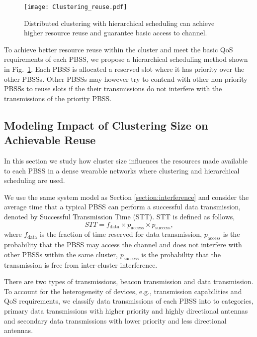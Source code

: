 \documentclass[10pt, conference, letterpaper]{IEEEtran}
\begin{document}
\begin{figure}
	\centering
	\texttt{[image: Clustering\_reuse.pdf]}
	\caption{Distributed clustering  with hierarchical scheduling can achieve higher resource reuse and guarantee basic access to channel.}
	\label{fig:clustering:reuse}
\end{figure}


To achieve better resource reuse within the cluster and meet the basic QoS requirements of each PBSS, we propose a hierarchical scheduling method shown in Fig.~\ref{fig:clustering:reuse}. 
Each PBSS is allocated a reserved slot where it has priority over the other PBSSs. 
Other PBSSs may however try to contend with other non-priority PBSSs to reuse slots if the their transmissions do not interfere with the transmissions of the priority PBSS.

\subsection{Modeling Impact of Clustering Size on Achievable Reuse}
In this section we study how cluster size influences the resources made available to each PBSS in a dense wearable networks where clustering and hierarchical scheduling are used. 

We use the same system model as Section \ref{section:interference} and consider the average time that a typical PBSS can perform a successful data transmission, denoted by Successful Transmission Time (STT).
STT is defined as follows, 
\begin{equation*}
STT = f_{\mathrm{data}}\times p_{\mathrm{access}} \times p_{\mathrm{success}},
\end{equation*}
where $f_{\mathrm{data}}$ is the fraction of time reserved for data transmission, $p_{\mathrm{access}}$ is the probability that the PBSS may access the channel and does not interfere with other PBSSs within the same cluster,
$p_{\mathrm{success}}$ is the probability that the transmission is free from inter-cluster interference.


There are two types of transmissions, beacon transmission and data transmission. To account for the heterogeneity of devices, e.g., transmission capabilities and QoS requirements, we classify data transmissions of each PBSS into to categories, primary data transmissions with higher priority and  highly directional antennas and secondary data transmissions with lower priority and less directional antennas. 
\end{document}
